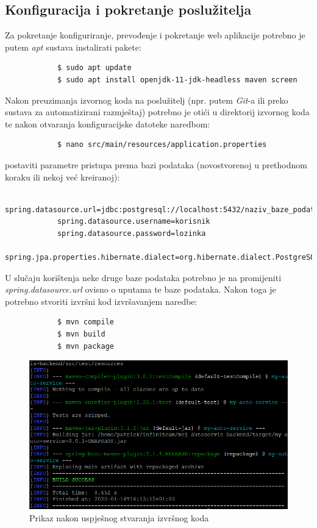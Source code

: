 		\subsection{Konfiguracija i pokretanje poslužitelja}
		Za pokretanje konfiguriranje, prevođenje i pokretanje web aplikacije potrebno je putem \textit{apt} sustava instalirati pakete:
		\begin{lstlisting}
			$ sudo apt update
			$ sudo apt install openjdk-11-jdk-headless maven screen
		\end{lstlisting}
		Nakon preuzimanja izvornog koda na poslužitelj (npr. putem \textit{Git}-a ili preko sustava za automatizirani razmještaj) potrebno je otići u direktorij izvornog koda te nakon otvaranja konfiguracijske datoteke naredbom:
		\begin{lstlisting}
			$ nano src/main/resources/application.properties
		\end{lstlisting}
		postaviti parametre pristupa prema bazi podataka (novostvorenoj u prethodnom koraku ili nekoj već kreiranoj):
		\begin{lstlisting}
			spring.datasource.url=jdbc:postgresql://localhost:5432/naziv_baze_podataka
			spring.datasource.username=korisnik
			spring.datasource.password=lozinka
			spring.jpa.properties.hibernate.dialect=org.hibernate.dialect.PostgreSQLDialect
		\end{lstlisting}
		U slučaju korištenja neke druge baze podataka potrebno je na promijeniti \textit{spring.datasource.url} ovisno o uputama te baze podataka. Nakon toga je potrebno stvoriti izvršni kod izvršavanjem naredbe:
		\begin{lstlisting}
			$ mvn compile
			$ mvn build
			$ mvn package
		\end{lstlisting}
		\begin{figure}[h]
			\centering
			\includegraphics[width=1.0\linewidth]{slike/deployment1}
			\caption{Prikaz nakon uspješnog stvaranja izvršnog koda}
			\label{fig:deployment1}
		\end{figure}
		
